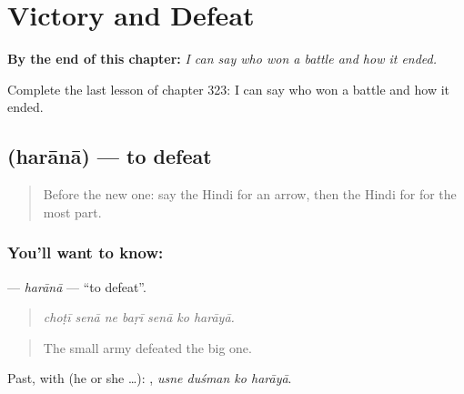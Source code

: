 
\chapter{Victory and Defeat}
\label{ch:hi-victory-and-defeat}

\begin{chapteropening}
\textbf{By the end of this chapter:} \emph{I can say who won a battle and how it ended.}

Complete the last lesson of chapter 323: I can say who won a battle and how it ended.
\end{chapteropening}

\section[\texorpdfstring{\hi{हराना} (harānā)}{हराना (harānā)}]{ (harānā) — to defeat}

\label{lesson:HI-C323-harana}



\begin{quote}
Before the new one: say the Hindi for an arrow, then the Hindi for for the most part.
\end{quote}

\subsection*{You'll want to know: }
\textbf{} — \emph{harānā} — \textquotedblleft{}to defeat\textquotedblright{}.

\begin{quote}
      
\end{quote}

\begin{quote}
\emph{choṭī senā ne baṛī senā ko harāyā.}
\end{quote}

\begin{quote}
The small army defeated the big one.
\end{quote}

Past, with  (he or she …):    , \emph{usne duśman ko harāyā}.

